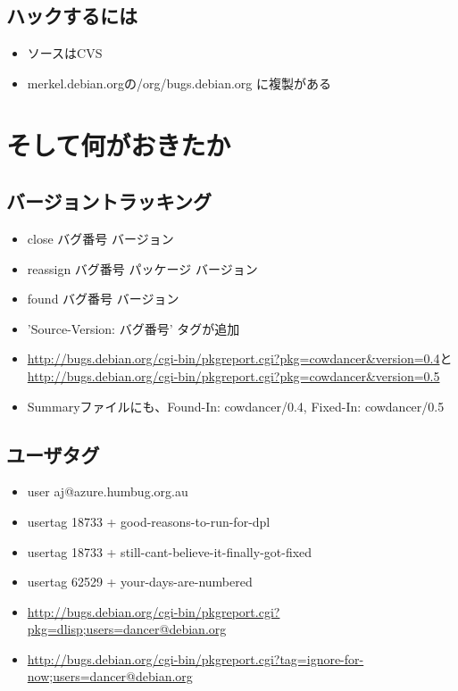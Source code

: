 \documentclass[cjk,dvipdfmx]{beamer}
\begin{document}
\subsection{ハックするには}

\begin{frame}
 \begin{itemize}
  \item ソースはCVS
  \item  merkel.debian.orgの/org/bugs.debian.org に複製がある
 \end{itemize}
\end{frame}

\section{そして何がおきたか}

\subsection{バージョントラッキング}

\begin{frame}
 \begin{itemize}
  \item close バグ番号 バージョン
  \item reassign バグ番号 パッケージ バージョン
  \item found バグ番号 バージョン
  \item 'Source-Version: バグ番号' タグが追加
  \item \url{http://bugs.debian.org/cgi-bin/pkgreport.cgi?pkg=cowdancer&version=0.4}と
\url{http://bugs.debian.org/cgi-bin/pkgreport.cgi?pkg=cowdancer&version=0.5}
  \item Summaryファイルにも、Found-In: cowdancer/0.4,
	Fixed-In: cowdancer/0.5
 \end{itemize}
\end{frame}


\subsection{ユーザタグ}

\begin{frame}
 \begin{itemize}
  \item user aj@azure.humbug.org.au
  \item usertag 18733 + good-reasons-to-run-for-dpl
  \item usertag 18733 + still-cant-believe-it-finally-got-fixed
  \item usertag 62529 + your-days-are-numbered
  \item \url{http://bugs.debian.org/cgi-bin/pkgreport.cgi?pkg=dlisp;users=dancer@debian.org}
  \item \url{http://bugs.debian.org/cgi-bin/pkgreport.cgi?tag=ignore-for-now;users=dancer@debian.org}
 \end{itemize}
\end{frame}
\end{document}
